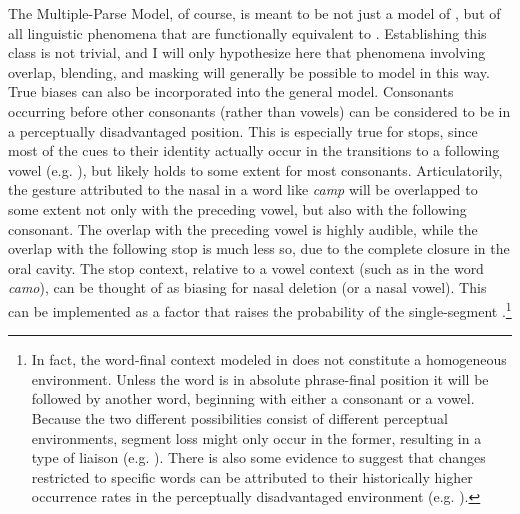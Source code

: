 The Multiple-Parse Model, of course, is meant to be not just a model
of , but of all linguistic phenomena that are functionally
equivalent to . Establishing this class is not trivial,
and I will only hypothesize here that phenomena involving 
overlap,  blending, and  masking will generally
be possible to model in this way. True  biases can also be
incorporated into the general model. Consonants occurring before other
consonants (rather than vowels) can be considered to be in a perceptually
disadvantaged position. This is especially true for stops, since most
of the cues to their identity actually occur in the transitions to
a following vowel (e.g. \citealt{liberman1954role}), but likely
holds to some extent for most consonants. Articulatorily, the 
gesture attributed to the nasal in a word like \textit{camp} will be
overlapped to some extent not only with the preceding vowel, but also
with the following consonant. The overlap with the preceding vowel
is highly audible, while the overlap with the following stop is much
less so, due to the complete closure in the oral cavity. The stop
context, relative to a vowel context (such as in the word \textit{camo}),
can be thought of as biasing for nasal deletion (or a nasal vowel).
This can be implemented as a factor that raises the probability of
the single-segment .\footnote{In fact, the word-final context modeled in 
does not constitute a homogeneous  environment. Unless the
 word is in absolute phrase-final position it will be followed
by another word, beginning with either a consonant or a vowel. Because
the two different possibilities consist of different perceptual environments,
segment loss might only occur in the former, resulting in a type of
liaison (e.g. \citealt{Tranel1981}). There is also some evidence
to suggest that changes restricted to specific words can be attributed
to their historically higher occurrence rates in the perceptually
disadvantaged environment (e.g. \citealt{brown2012discourse}).}

